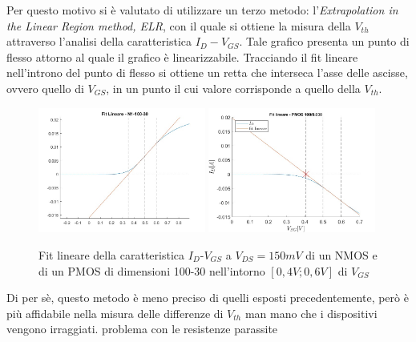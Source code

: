 \documentclass[12pt, letterpaper]{book}
\begin{document}
Per questo motivo si è valutato di utilizzare un terzo metodo: l'\emph{Extrapolation in the Linear Region method, ELR}, con il quale si ottiene la misura della $V_{th}$ attraverso l'analisi della caratteristica $I_D-V_{GS}$.  Tale grafico presenta un punto di flesso attorno al quale il grafico è linearizzabile. Tracciando il fit lineare nell'introno del punto di flesso si ottiene un retta che interseca l'asse delle ascisse, ovvero quello di $V_{GS}$, in un punto il cui valore corrisponde a quello della $V_{th}$.\\


\begin{figure}[h!]
\centering
 \includegraphics[width=0.49\textwidth]{LinearFit-N1-100-30}
 \includegraphics[width=0.49\textwidth]{LinearFit-P1-100-30}
 \caption{Fit lineare della caratteristica  $I_D$-$V_{GS}$ a $V_{DS}=150mV$ di un NMOS e di un PMOS di dimensioni 100-30 nell'intorno $[0,4V ; 0,6V]$ di $V_{GS}$}
\end{figure}

Di per sè, questo metodo è meno preciso di quelli esposti precedentemente, però è più affidabile nella misura delle differenze di $V_{th}$ man mano che i dispositivi vengono irraggiati. problema con le resistenze parassite
\end{document}
